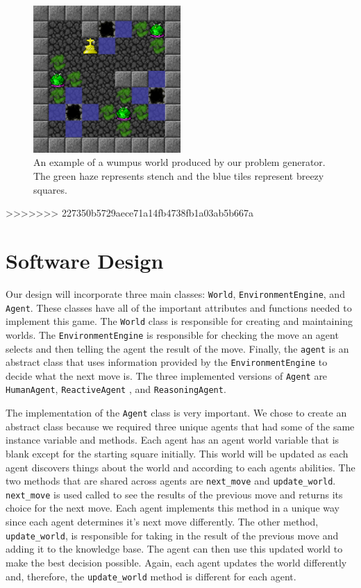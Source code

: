 \documentclass{article}
\begin{document}
		\begin{figure}
			\centering
			\includegraphics[width=0.5\textwidth]{images/ex_ww}
			\caption{An example of a wumpus world produced by our problem generator. The green haze represents stench and the blue tiles represent breezy squares.}
			\label{ex_ww}
		\end{figure}
>>>>>>> 227350b5729aece71a14fb4738fb1a03ab5b667a
	
	\section{Software Design}
		Our design will incorporate three main classes: \texttt{World}, \texttt{EnvironmentEngine}, and \texttt{Agent}. 
		These classes have all of the important attributes and functions needed to implement this game.
		The \texttt{World} class is responsible for creating and maintaining worlds.
		The \texttt{EnvironmentEngine} is responsible for checking the move an agent selects and then telling the agent the result of the move.
		Finally, the \texttt{agent} is an abstract class that uses information provided by the \texttt{EnvironmentEngine} to decide what the next move is. The three implemented versions of \texttt{Agent} are \texttt{HumanAgent}, \texttt{ReactiveAgent} , and \texttt{ReasoningAgent}.
		
		
		
	
		
		The implementation of the  \texttt{Agent} class is very important. 
		We chose to create an abstract class because we required three unique agents that had some of the same instance variable and methods. Each agent has an agent world variable that is blank except for the starting square initially. 
		This world will be updated as each agent discovers things about the world and according to each agents abilities. 
		The two methods that are shared across agents are \texttt{next\_move} and \texttt{update\_world}. 
		\texttt{next\_move} is used called to see the results of the previous move and returns its choice for the next move. 
		Each agent implements this method in a unique way since each agent determines it's next move differently. 
		The other method, \texttt{update\_world}, is responsible for taking in the result of the previous move and adding it to the knowledge base. 
		The agent can then use this updated world to make the best decision possible. 
		Again, each agent updates the world differently and, therefore, the \texttt{update\_world} method is different for each agent.
		
\end{document}
